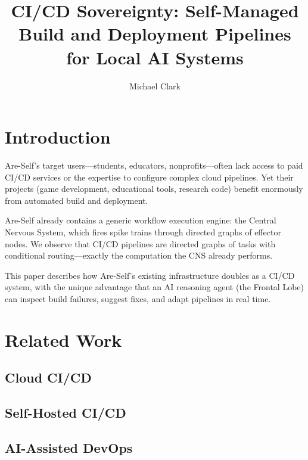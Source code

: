 \documentclass[man,12pt,floatsintext]{apa7}
\title{CI/CD Sovereignty: Self-Managed Build and Deployment Pipelines for Local AI Systems}
\author{Michael Clark}
\affiliation{Independent Researcher \\ scipraxian}
\begin{document}
\maketitle

\section{Introduction}

Are-Self's target users---students, educators, nonprofits---often lack access to paid
CI/CD services or the expertise to configure complex cloud pipelines. Yet their projects
(game development, educational tools, research code) benefit enormously from automated
build and deployment.

Are-Self already contains a generic workflow execution engine: the Central Nervous System,
which fires spike trains through directed graphs of effector nodes. We observe that CI/CD
pipelines are directed graphs of tasks with conditional routing---exactly the computation
the CNS already performs.

This paper describes how Are-Self's existing infrastructure doubles as a CI/CD system,
with the unique advantage that an AI reasoning agent (the Frontal Lobe) can inspect build
failures, suggest fixes, and adapt pipelines in real time.

\section{Related Work}

\subsection{Cloud CI/CD}


\subsection{Self-Hosted CI/CD}


\subsection{AI-Assisted DevOps}
\end{document}
